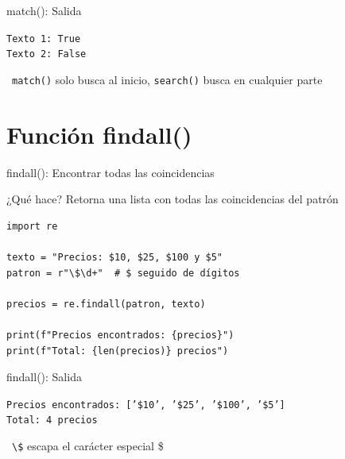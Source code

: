 \documentclass{beamer}
\begin{document}
\begin{frame}[fragile]{match(): Salida \faArrowCircleRight}
\begin{tcolorbox}[colback=green!10,colframe=green,title={\small\faArrowCircleRight \ Salida},coltitle=fg0,left=3pt,right=3pt,top=3pt,bottom=3pt,boxsep=2pt]
\small\texttt{Texto 1: True\\
Texto 2: False}
\end{tcolorbox}

\vspace{0.3cm}
\begin{notebox}
\small\faExclamationTriangle\ \texttt{match()} solo busca al inicio, \texttt{search()} busca en cualquier parte
\end{notebox}
\end{frame}

\section{Función findall()}

\begin{frame}[fragile]{findall(): Encontrar todas las coincidencias \faListUl}
\begin{conceptbox}{¿Qué hace?}
Retorna una lista con todas las coincidencias del patrón
\end{conceptbox}

\begin{lstlisting}
import re

texto = "Precios: $10, $25, $100 y $5"
patron = r"\$\d+"  # $ seguido de dígitos

precios = re.findall(patron, texto)

print(f"Precios encontrados: {precios}")
print(f"Total: {len(precios)} precios")
\end{lstlisting}
\end{frame}

\begin{frame}[fragile]{findall(): Salida \faArrowCircleRight}
\begin{tcolorbox}[colback=green!10,colframe=green,title={\small\faArrowCircleRight \ Salida},coltitle=fg0,left=3pt,right=3pt,top=3pt,bottom=3pt,boxsep=2pt]
\small\texttt{Precios encontrados: ['\$10', '\$25', '\$100', '\$5']\\
Total: 4 precios}
\end{tcolorbox}

\vspace{0.3cm}
\begin{notebox}
\small\faInfoCircle\ \texttt{\textbackslash\$} escapa el carácter especial \$
\end{notebox}
\end{frame}
\end{document}

